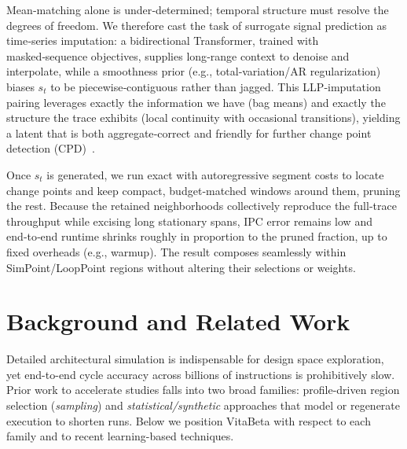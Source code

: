Mean‑matching alone is under‑determined; temporal structure must resolve the degrees of freedom. We therefore cast the task of surrogate signal prediction as time‑series imputation: a bidirectional Transformer, trained with masked‑sequence objectives, supplies long‑range context to denoise and interpolate, while a smoothness prior (e.g., total‑variation/AR regularization) biases \(s_t\) to be piecewise‑contiguous rather than jagged. This LLP‑imputation pairing leverages exactly the information we have (bag means) and exactly the structure the trace exhibits (local continuity with occasional transitions), yielding a latent that is both aggregate‑correct and friendly for further change point detection (CPD)~\cite{yu2014-llp,scott2020-llp,law2018-agg,zhang2020-agg}.

Once \(s_t\) is generated, we run exact \pelt with autoregressive segment costs to locate change points and keep compact, budget‑matched windows around them, pruning the rest. Because the retained neighborhoods collectively reproduce the full‑trace throughput while excising long stationary spans, IPC error remains low and end‑to‑end runtime shrinks roughly in proportion to the pruned fraction, up to fixed overheads (e.g., warmup). The result composes seamlessly within SimPoint/LoopPoint regions without altering their selections or weights.
 

\section{Background and Related Work}\label{background}

Detailed architectural simulation is indispensable for design space exploration, yet end-to-end cycle accuracy across billions of instructions is prohibitively slow. Prior work to accelerate studies falls into two broad families: profile-driven region selection (\emph{sampling}) and \emph{statistical/synthetic} approaches that model or regenerate execution to shorten runs.  Below we position VitaBeta with respect to each family and to recent learning-based techniques. 

